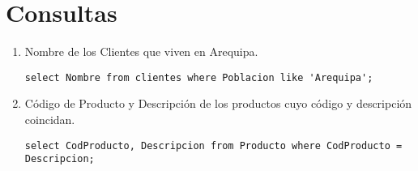 \documentclass[a4paper,12pt]{article}
\begin{document}
\section{Consultas}

\begin{enumerate}

\item Nombre de los Clientes que viven en Arequipa.

\begin{lstlisting}
select Nombre from clientes where Poblacion like 'Arequipa';
\end{lstlisting}

\item Código de Producto y Descripción de los productos cuyo código y descripción coincidan.

\begin{lstlisting}
select CodProducto, Descripcion from Producto where CodProducto = Descripcion;
\end{lstlisting}


\end{enumerate}
\end{document}
